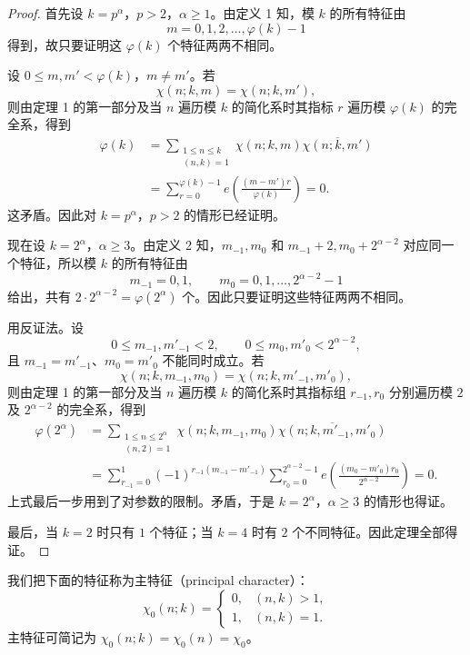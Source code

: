\begin{proof}
	首先设 $k=p^\alpha$，$p>2$，$\alpha\geq 1$。由定义 1 知，模 $k$ 的所有特征由
	\[
		m=0,1,2,\ldots,\varphi(k)-1
	\]
	得到，故只要证明这 $\varphi(k)$ 个特征两两不相同。

	设 $0\leq m,m'<\varphi(k)$，$m\neq m'$。若
	\[
		\chi(n;k,m)=\chi(n;k,m'),
	\]
	则由定理 1 的第一部分及当 $n$ 遍历模 $k$ 的简化系时其指标 $r$ 遍历模 $\varphi(k)$ 的完全系，得到
	\[
	\begin{aligned}
		\varphi(k)
		&=
		\sum_{\substack{1\leq n\leq k\\ (n,k)=1}}
		\chi(n;k,m)\overline{\chi(n;k,m')}  \\
		&=
		\sum_{r=0}^{\varphi(k)-1}
		e\left(\frac{(m-m')r}{\varphi(k)}\right)
		=0.
	\end{aligned}
	\]
	这矛盾。因此对 $k=p^\alpha$，$p>2$ 的情形已经证明。

	现在设 $k=2^\alpha$，$\alpha\geq 3$。由定义 2 知，$m_{-1},m_0$ 和 $m_{-1}+2,m_0+2^{\alpha-2}$ 对应同一个特征，所以模 $k$ 的所有特征由
	\[
		m_{-1}=0,1,\qquad m_0=0,1,\ldots,2^{\alpha-2}-1
	\]
	给出，共有 $2\cdot 2^{\alpha-2}=\varphi(2^\alpha)$ 个。因此只要证明这些特征两两不相同。

	用反证法。设
	\[
		0\leq m_{-1},m'_{-1}<2,\qquad
		0\leq m_0,m'_0<2^{\alpha-2},
	\]
	且 $m_{-1}=m'_{-1}$、$m_0=m'_0$ 不能同时成立。若
	\[
		\chi(n;k,m_{-1},m_0)=\chi(n;k,m'_{-1},m'_0),
	\]
	则由定理 1 的第一部分及当 $n$ 遍历模 $k$ 的简化系时其指标组 $r_{-1},r_0$ 分别遍历模 $2$ 及 $2^{\alpha-2}$ 的完全系，得到
	\[
	\begin{aligned}
		\varphi(2^\alpha)
		&=
		\sum_{\substack{1\leq n\leq 2^\alpha\\ (n,2)=1}}
		\chi(n;k,m_{-1},m_0)\overline{\chi(n;k,m'_{-1},m'_0)}  \\
		&=
		\sum_{r_{-1}=0}^{1}(-1)^{r_{-1}(m_{-1}-m'_{-1})}
		\sum_{r_0=0}^{2^{\alpha-2}-1}
		e\left(\frac{(m_0-m'_0)r_0}{2^{\alpha-2}}\right)
		=0.
	\end{aligned}
	\]
	上式最后一步用到了对参数的限制。矛盾，于是 $k=2^\alpha$，$\alpha\geq 3$ 的情形也得证。

	最后，当 $k=2$ 时只有 $1$ 个特征；当 $k=4$ 时有 $2$ 个不同特征。因此定理全部得证。
\end{proof}

我们把下面的特征称为主特征（principal character）：
\begin{equation}
	\chi_0(n;k)=
	\begin{cases}
		0, & (n,k)>1,\\
		1, & (n,k)=1.
	\end{cases}
	\tag{5}
\end{equation}
主特征可简记为 $\chi_0(n;k)=\chi_0(n)=\chi_0$。

